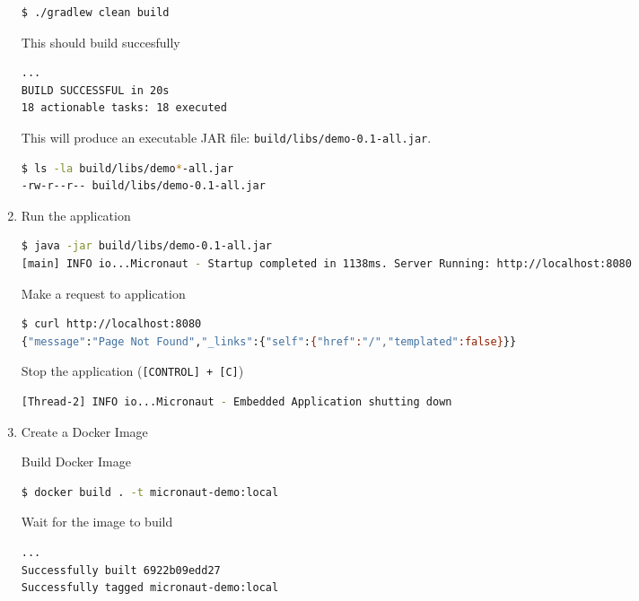 \begin{enumerate}
\begin{lstlisting}[language=bash]
$ ./gradlew clean build
\end{lstlisting}

This should build succesfully

\begin{lstlisting}[language=bash]
...
BUILD SUCCESSFUL in 20s
18 actionable tasks: 18 executed
\end{lstlisting}

This will produce an executable JAR file: \texttt{build/libs/demo-0.1-all.jar}.

\begin{lstlisting}[language=bash]
$ ls -la build/libs/demo*-all.jar
-rw-r--r-- build/libs/demo-0.1-all.jar
\end{lstlisting}

\item Run the application

\begin{lstlisting}[language=bash]
$ java -jar build/libs/demo-0.1-all.jar
[main] INFO io...Micronaut - Startup completed in 1138ms. Server Running: http://localhost:8080
\end{lstlisting}

Make a request to application

\begin{lstlisting}[language=bash]
$ curl http://localhost:8080
{"message":"Page Not Found","_links":{"self":{"href":"/","templated":false}}}
\end{lstlisting}

Stop the application (\texttt{[CONTROL] + [C]})

\begin{lstlisting}[language=bash]
[Thread-2] INFO io...Micronaut - Embedded Application shutting down
\end{lstlisting}

\item Create a Docker Image

Build Docker Image

\begin{lstlisting}[language=bash]
$ docker build . -t micronaut-demo:local
\end{lstlisting}

Wait for the image to build

\begin{lstlisting}[language=bash]
...
Successfully built 6922b09edd27
Successfully tagged micronaut-demo:local
\end{lstlisting}


\end{enumerate}
